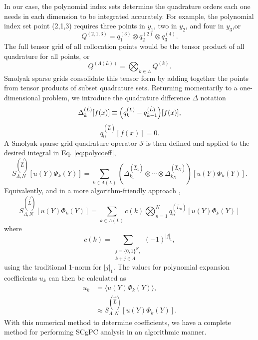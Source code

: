 In our case, the
polynomial index sets determine the quadrature orders each one needs in each dimension to be integrated
accurately.  For example, the polynomial index set point (2,1,3) requires three points in $y_1$, two in $y_2$,
and four in $y_3$,or
\begin{equation}
  Q^{(2,1,3)} = q^{(3)}_1 \otimes q^{(2)}_2 \otimes q^{(4)}_3.
\end{equation}
The full tensor grid of all collocation points would be the tensor product of all quadrature for all points,
or
\begin{equation}
  Q^{(\Lambda(L))} = \bigotimes_{k\in\Lambda}Q^{(k)}.
\end{equation}
Smolyak sparse grids consolidate this tensor form by adding together the points from tensor products of subset
quadrature sets.  Returning momentarily to a one-dimensional problem, we introduce the quadrature difference 
$\Delta$ notation \cite{sparse1}
\begin{equation}
  \Delta_k^{(\hat L)}[f(x)] \equiv \qty(q_k^{(\hat L)} - q_{k-1}^{(\hat L)})[f(x)],
\end{equation}
\begin{equation}
  q_0^{(\hat L)}[f(x)] = 0.
\end{equation}
A Smolyak sparse grid quadrature operator $\mathcal S$ is then defined and applied to the desired integral in
Eq. \ref{eq:polycoeff},
\begin{equation}
  S^{(\vec{\hat L})}_{\Lambda,N}[u(Y)\Phi_k(Y)] = \sum_{k\in\Lambda(L)} \left(\Delta_{k_1}^{(\hat L_1)} \otimes \cdots \otimes
  \Delta_{k_N}^{(\hat L_N)}\right)[u(Y)\Phi_k(Y)].
\end{equation}
Equivalently, and in a more algorithm-friendly approach \cite{sparseSC},
\begin{equation}
  S^{(\vec{\hat L})}_{\Lambda,N}[u(Y)\Phi_k(Y)] = \sum_{k\in\Lambda(L)} c(k)\bigotimes_{n=1}^N
  q^{(\hat L_n)}_n[u(Y)\Phi_k(Y)]
\end{equation}
where
\begin{equation}
  c(k) = \sum_{\substack{j=\{0,1\}^N,\\k+j\in\Lambda}} (-1)^{|j|_1},
\end{equation}
using the traditional 1-norm for $|j|_1$.
The values for polynomial expansion coefficients $u_k$ can then be calculated as
\begin{align}
  u_k &= \langle u(Y)\Phi_k(Y) \rangle,\\
      &\approx S^{(\vec{\hat L})}_{\Lambda,N}[u(Y)\Phi_k(Y)].
\end{align}
With this numerical method to determine coefficients, we have a complete method for performing SCgPC
analysis in an algorithmic manner.


